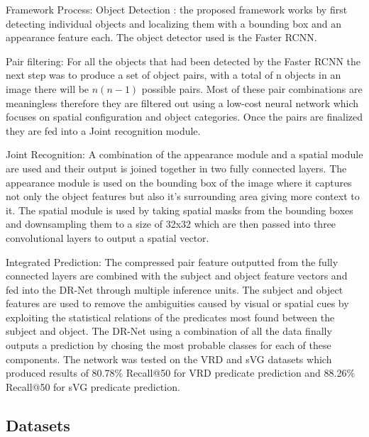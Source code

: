 \documentclass{csfyp}
\begin{document}
Framework Process:
Object Detection : the proposed framework works by first detecting individual objects and localizing them with a bounding box  and an appearance feature each. The object detector used is the Faster RCNN.

Pair filtering:
For all the objects that had been detected by the Faster RCNN the next step was to produce a set of object pairs, with a total of n objects in an image there will be $n(n-1)$ possible pairs. Most of these pair combinations are meaningless therefore they are filtered out using a low-cost neural network which focuses on spatial configuration and object categories. Once the pairs are finalized they are fed into a Joint recognition module.

Joint Recognition:
A combination of the appearance module and a spatial module are used and their output is joined together in two fully connected layers. The appearance module is used on the bounding box of the image where it captures not only the object features but also it’s surrounding area giving more context to it. The spatial module is used by taking spatial masks from the bounding boxes and downsampling them to a size of 32x32 which are then passed into three convolutional layers to output a spatial vector. 

Integrated Prediction:
The compressed pair feature outputted from the fully connected layers are combined with the subject and object feature vectors and fed into the DR-Net through multiple inference units. The subject and object features are used to remove the ambiguities caused by visual or spatial cues by exploiting the statistical relations of the predicates most found between the subject and object. The DR-Net using a combination of all the data finally outputs a prediction by chosing the most probable classes for each of these components. 
The network was tested on the VRD and sVG datasets which produced results of 80.78\% Recall@50 for VRD predicate prediction and 88.26\% Recall@50 for sVG predicate prediction.

\subsection{Datasets}
\end{document}
